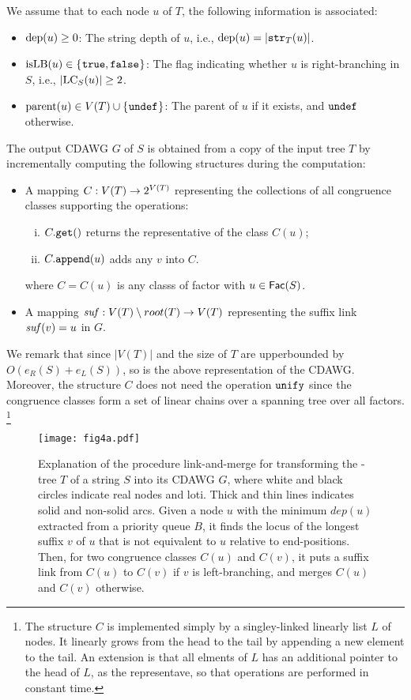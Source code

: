 We assume that to each node $u$ of $T$, the following information is associated:
\begin{itemize}
\item $\mathrm{dep}(u)\ge 0$: The string depth of $u$, i.e., $\mathrm{dep}(u) = |\mathtt{str}_T(u)|$.
\item $\mathrm{isLB}(u) \in \{\kern0.05em\tt true, false\kern0.05em\}$: The flag indicating whether $u$ is right-branching in $S$, i.e., $|\mathrm{LC}_{S}(u)|\ge 2$. 
\item $\mathrm{parent}(u) \in V(T)\cup\{\kern0.05em\mathtt{undef}\kern0.05em\}$: The parent of $u$ if it exists, and $\mathtt{undef}$ otherwise. 
\end{itemize}

The output CDAWG $G$ of $S$ is obtained from a copy of the input tree $T$ by incrementally computing the following structures during the computation: 
\begin{itemize}
\item A mapping $C: V(T) \to 2^{V(T)}$ representing the collections of all congruence classes supporting the operations:
\begin{enumerate}[(i)]
\item $C.\mathtt{get}()$ returns the representative of the class $C(u)$;
\item $C.\mathtt{append}(u)$ adds any $v$ into $C$. 
\end{enumerate}
where $C = C(u)$ is any classs of factor with $u \in \mathsf{Fac}{(S)}$.
  
\item A mapping $\mathit{suf}: V(T)\setminus{root(T)} \to V(T)$ representing the suffix link $\mathit{suf}(v) = u$ in $G$. 
\end{itemize}

We remark that since $|V(T)|$ and the size of $T$ are upperbounded by $O(e_R(S) + e_L(S))$, so is the above representation of the CDAWG. 
Moreover, the structure $C$ does not need the operation $\mathtt{unify}$ since the congruence classes form a set of linear chains over a spanning tree over all factors.%
\footnote{The structure $C$ is implemented simply by a singley-linked linearly list $L$ of nodes. It linearly grows from the head to the tail by appending a new element to the tail. An extension is that all elments of $L$ has an additional pointer to the head of $L$, as the representave, so that operations are performed in constant time.
}

\begin{figure}[t]
\centering
\texttt{[image: fig4a.pdf]}
\vspace{.5\baselineskip}
\caption{Explanation of the procedure link-and-merge for transforming the \LPTrm-tree $T$ of a string $S$ into its CDAWG $G$, where white and black circles indicate real nodes and loti. Thick and thin lines indicates solid and non-solid arcs. Given a node $u$ with the minimum $dep(u)$ extracted from a priority queue $B$, it finds the locus of the longest suffix $v$ of $u$ that is not equivalent to $u$ relative to end-positions. Then,
  for two congruence classes $C(u)$ and $C(v)$, 
  it puts a suffix link from $C(u)$ to $C(v)$ if $v$ is left-branching, and merges $C(u)$ and $C(v)$ otherwise. 
}\label{fig:three:suffix:link}
\end{figure}

